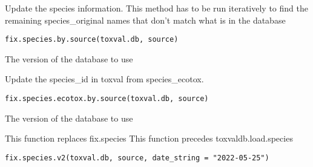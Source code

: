 \documentclass[letterpaper]{book}
\begin{document}
%
\begin{Description}\relax
Update the species information. This method has to be run iteratively to find
the remaining species\_original names that don't match what is in the database
\end{Description}
%
\begin{Usage}
\begin{verbatim}
fix.species.by.source(toxval.db, source)
\end{verbatim}
\end{Usage}
%
\begin{Arguments}
\begin{ldescription}
\item[\code{toxval.db}] The version of the database to use
\end{ldescription}
\end{Arguments}
%
\begin{Description}\relax
Update the species\_id in toxval from species\_ecotox.
\end{Description}
%
\begin{Usage}
\begin{verbatim}
fix.species.ecotox.by.source(toxval.db, source)
\end{verbatim}
\end{Usage}
%
\begin{Arguments}
\begin{ldescription}
\item[\code{toxval.db}] The version of the database to use
\end{ldescription}
\end{Arguments}
%
\begin{Description}\relax
This function replaces fix.species
This function precedes toxvaldb.load.species
\end{Description}
%
\begin{Usage}
\begin{verbatim}
fix.species.v2(toxval.db, source, date_string = "2022-05-25")
\end{verbatim}
\end{Usage}
\end{document}
